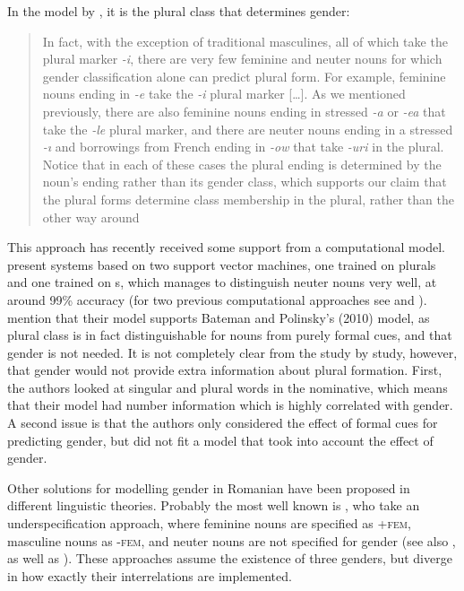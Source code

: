 In the model by \textcite{Bateman.2010}, it is the plural class that determines gender:

\begin{quotation}
  In fact, with the exception of traditional masculines, all of which take the plural marker \textit{-i}, there are very few feminine and neuter nouns for which gender classification alone can predict plural form. For example, feminine nouns ending in \textit{-e} take the \textit{-i} plural marker [\dots]. As we mentioned previously, there are also feminine nouns ending in stressed \textit{-a} or \textit{-ea} that take the \textit{-le} plural marker, and there are neuter nouns ending in a stressed \textit{-ı} and borrowings from French ending in \textit{-ow} that take \textit{-uri} in the plural. Notice that in each of these cases the plural ending is determined by the noun’s ending rather than its gender class, which supports our claim that the plural forms determine class membership in the plural, rather than the other way around \autocite[54]{Bateman.2010}
\end{quotation}

This approach has recently received some support from a computational model. \textcite{Dinu.2012} present systems based on two support vector machines, one trained on plurals and one trained on s, which manages to distinguish neuter nouns very well, at around 99\% accuracy (for two previous computational approaches see \citealt{Cucerzan.2003} and \citealt{Nastase.2009}). \textcite[123]{Dinu.2012} mention that their model supports Bateman and Polinsky's (2010) model, as plural class is in fact distinguishable for nouns from purely formal cues, and that gender is not needed. It is not completely clear from the study by \textcite{Dinu.2012} study, however, that gender would not provide extra information about plural formation. First, the authors looked at singular and plural words in the nominative, which means that their model had number information which is highly correlated with gender. A second issue is that the authors only considered the effect of formal cues for predicting gender, but did not fit a model that took into account the effect of gender.

Other solutions for modelling gender in Romanian have been proposed in different linguistic theories. Probably the most well known is \textcite{Farkas.1995}, who take an underspecification approach, where feminine nouns are specified as +\textsc{fem}, masculine nouns as -\textsc{fem}, and neuter nouns are not specified for gender (see also \citealt{Farkas.1990}, as well as \citealt{Sadler.2006, Wechsler.2008, Kramer.2015}). These approaches assume the existence of three genders, but diverge in how exactly their interrelations are implemented.

